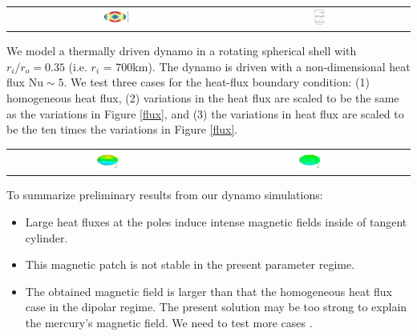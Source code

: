 \documentclass[landscape,a0b,final]{a0poster}
\begin{document}
\begin{multicols}{3}
\begin{center}
\begin{tabular}{cc}
 \includegraphics[width=0.18\textwidth]{CMB_flux.pdf} &
 \includegraphics[width=0.08\textwidth]{gauss_coefficients.pdf} \\
\end{tabular}
\label{flux}
\end{center}
We model a thermally driven dynamo in a rotating spherical shell with $r_{i}/r_{o} = 0.35$ (i.e.  $r_i$ = 700km).  The dynamo is driven with a non-dimensional heat flux $\mathrm{Nu} \sim 5$.  We test three cases for the heat-flux boundary condition: (1) homogeneous heat flux, (2) variations in the heat flux are scaled to be the same as the variations in Figure \ref{flux}, and (3) the variations in heat flux are scaled to be the ten times the variations in Figure \ref{flux}.
\begin{center}
\begin{tabular}{cc}
 \includegraphics[width=0.12\textwidth]{br_cmb_x0.png} &
 \includegraphics[width=0.12\textwidth]{br_cmb_x10.png}
\end{tabular}
\label{dynamo}
\end{center}

To summarize preliminary results from our dynamo simulations:
\begin{itemize}
\item Large heat fluxes at the poles induce intense magnetic fields inside of tangent cylinder.
\item This magnetic patch is not stable in the present parameter regime.
\item The obtained magnetic field is larger than that  the homogeneous heat flux case in the dipolar regime. The present solution may be too strong to explain the mercury's magnetic field. We need to test more cases .
\end{itemize}


\end{multicols}
\end{document}
